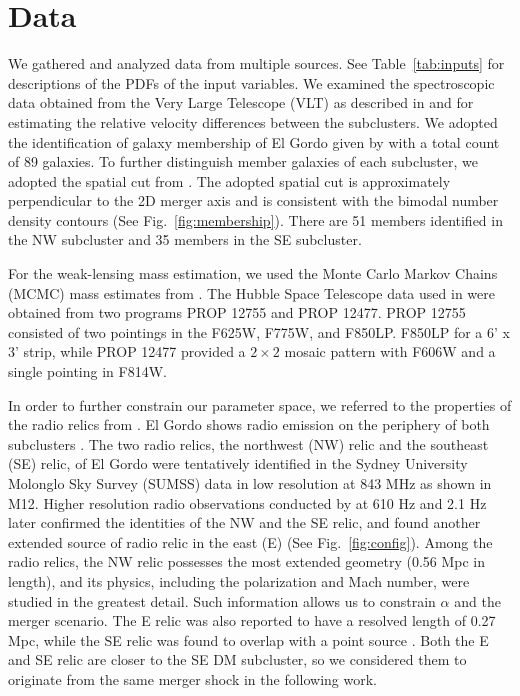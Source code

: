 \documentclass[ucdthesis.tex]{subfiles}
\begin{document}
    \section{Data} 
    We gathered and analyzed data from multiple sources. 
    See Table~\ref{tab:inputs} for descriptions of the PDFs of the input
    variables. 
    We examined the
    spectroscopic data obtained from the Very Large Telescope (VLT) as described in  and \citet{Sifon13} for estimating the
    relative velocity differences between the subclusters.
    We adopted the identification of galaxy membership of El Gordo given by
    \citet{Sifon13} with a total count of 89 galaxies.
    To further distinguish member galaxies of each subcluster, we adopted the
    spatial cut from .
    The adopted spatial cut is approximately perpendicular to the 2D merger
    axis  and is consistent with
    the bimodal number density contours (See Fig.~\ref{fig:membership}). 
    There are 51 members identified in the NW subcluster and 35 members in the SE
    subcluster. \par 
    For the weak-lensing mass estimation, we used the
    Monte Carlo Markov Chains (MCMC) mass estimates from .
    The Hubble Space Telescope data used in  were obtained from two
    programs PROP 12755 and PROP 12477. PROP 12755 consisted of two pointings in the F625W, F775W, and F850LP.
    F850LP for a 6' x 3' strip, while PROP 12477 provided a $2 \times 2$ mosaic
    pattern with F606W and a single pointing in F814W. 
    \par 
    In order to further constrain our parameter space, we referred to the properties of
    the radio relics from \citet{L13}. El Gordo shows radio emission on the
    periphery of both subclusters . The two radio relics, the
    northwest (NW) relic and the southeast (SE) relic, of El Gordo were
    tentatively identified
    in the Sydney University Molonglo Sky Survey (SUMSS) data in low
    resolution at 843 MHz \citep{Mauch03} as shown in M12. Higher
    resolution radio observations conducted by \cite{L13} at 610 \mega Hz and
    2.1 \giga Hz later confirmed the identities of the NW and the SE relic, and
    found another extended source of radio relic in the east (E) (See Fig.~\ref{fig:config}). Among the radio relics, the NW relic possesses the most extended geometry
    (0.56 Mpc in length), and its physics, including the
    polarization and Mach number, were studied in the greatest detail. Such
    information allows us to constrain $\alpha$ and the merger scenario. The E relic
    was also reported to have a resolved length of 0.27 Mpc, while the SE relic
    was found to overlap with a point source \citep{L13}. Both the E and SE
    relic are closer to the SE DM subcluster, so we considered them to
    originate from the same merger shock in the following work.
\end{document}

